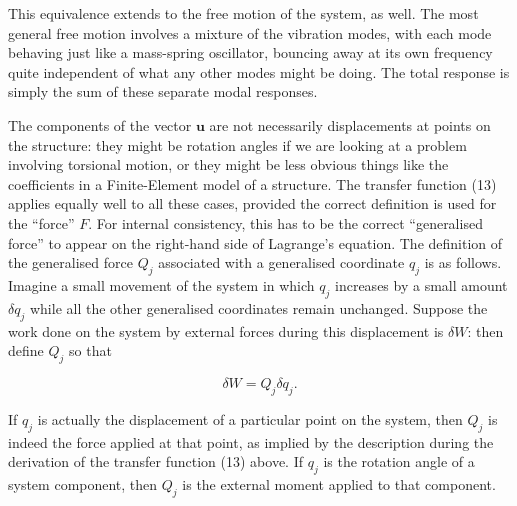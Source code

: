   This equivalence extends to the free motion of the system, as well. The most 
  general free motion involves a mixture of the vibration modes, with each mode 
  behaving just like a mass-spring oscillator, bouncing away at its own 
  frequency quite independent of what any other modes might be doing. The total 
  response is simply the sum of these separate modal responses. 

  The components of the vector $\mathbf{u}$ are not necessarily displacements 
  at points on the structure: they might be rotation angles if we are looking 
  at a problem involving torsional motion, or they might be less obvious things 
  like the coefficients in a Finite-Element model of a structure. The transfer 
  function (13) applies equally well to all these cases, provided the correct 
  definition is used for the ``force'' $F$. For internal consistency, this has 
  to be the correct ``generalised force'' to appear on the right-hand side of 
  Lagrange's equation. The definition of the generalised force $Q_j$ associated 
  with a generalised coordinate $q_j$ is as follows. Imagine a small movement 
  of the system in which $q_j$ increases by a small amount $\delta q_j$ while 
  all the other generalised coordinates remain unchanged. Suppose the work done 
  on the system by external forces during this displacement is $\delta W$: then 
  define $Q_j$ so that 

  $$\delta W=Q_j \delta q_j. \tag{14}$$ 

  If $q_j$ is actually the displacement of a particular point on the system, 
  then $Q_j$ is indeed the force applied at that point, as implied by the 
  description during the derivation of the transfer function (13) above. If 
  $q_j$ is the rotation angle of a system component, then $Q_j$ is the external 
  moment applied to that component. 
